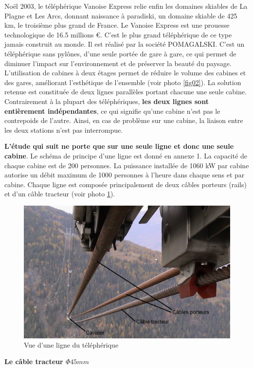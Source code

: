 Noël 2003, le téléphérique Vanoise Express relie enfin les domaines skiables de La Plagne et Les Arcs, donnant naissance à paradiski, un domaine skiable de 425 km, le troisième plus grand de France.
	Le Vanoise Express est une prouesse technologique de 16.5 millions \euro. C'est le plus grand téléphérique de ce type jamais construit au monde. Il est réalisé par la société POMAGALSKI. C'est un téléphérique sans pylônes, d'une seule portée de gare à gare, ce qui permet de diminuer l'impact sur l'environnement et de préserver la beauté du paysage. L'utilisation de cabines à deux étages permet de réduire le volume des cabines et des gares, améliorant l'esthétique de l'ensemble (voir photo \ref{fig02}).
	La solution retenue est constituée de deux lignes parallèles portant chacune une seule cabine. Contrairement à la plupart des téléphériques, \textbf{les deux lignes sont entièrement indépendantes}, ce qui signifie qu'une cabine n'est pas le contrepoids de l'autre. Ainsi, en cas de problème sur une cabine, la liaison entre les deux stations n'est pas interrompue. 

\textbf{L'étude qui suit ne porte que sur une seule ligne et donc une seule cabine}.
Le schéma de principe d'une ligne est donné en annexe 1. La capacité de chaque cabine est de 200 personnes. La puissance installée de 1060 kW par cabine autorise un débit maximum de 1000 personnes à l'heure dans chaque sens et par cabine. Chaque ligne est composée principalement de deux câbles porteurs (rails) et d'un câble tracteur (voir photo \ref{fig03}).

\newpage

\begin{figure}[!h]
\centering
\includegraphics[width=0.6\linewidth]{img/fig03}
\caption{Vue d'une ligne du téléphérique}
\label{fig03}
\end{figure}

\textbf{Le câble tracteur $\Phi 45mm$}


